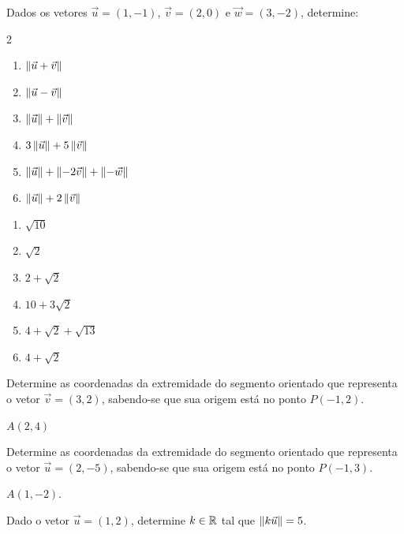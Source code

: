 \documentclass[12pt]{exam}
\begin{document}
\questao{} Dados os vetores $\vec{u} = (1, -1)$, $\vec{v} = (2, 0)$ e $\vec{w} = (3, -2)$, determine:
\begin{multicols}{2}
    \begin{enumerate}[label=({\alph*})]
        \item $\left\Vert{\vec{u} + \vec{v}}\right\Vert$
        \item $\left\Vert{\vec{u} - \vec{v}}\right\Vert$
        \item $\left\Vert{\vec{u}}\right\Vert + \left\Vert{\vec{v}}\right\Vert$
        \item $3\left\Vert{\vec{u}}\right\Vert + 5\left\Vert{\vec{v}}\right\Vert$
        \item $\left\Vert{\vec{u}}\right\Vert + \left\Vert{-2\vec{v}}\right\Vert + \left\Vert{-\vec{w}}\right\Vert$
        \item $\left\Vert{\vec{u}}\right\Vert + 2\left\Vert{\vec{v}}\right\Vert$
    \end{enumerate}
\end{multicols}
\begin{solucao}
    \begin{enumerate}[label=({\alph*})]
        \item $\sqrt{10}$
        \item $\sqrt{2}$
        \item $2 + \sqrt{2}$
        \item $10 + 3\sqrt{2}$
        \item $4 + \sqrt{2} + \sqrt{13}$
        \item $4 + \sqrt{2}$
    \end{enumerate}
\end{solucao}

\vspace{.3cm}

\questao{} Determine as coordenadas da extremidade do segmento orientado que representa o vetor $\vec{v} = (3,2)$, sabendo-se que sua origem está no ponto $P(-1,2)$.
\begin{solucao}
    $A(2,4)$
\end{solucao}

\vspace{.3cm}

\questao{} Determine as coordenadas da extremidade do segmento orientado que representa o vetor $\vec{u} = (2,-5)$, sabendo-se que sua origem está no ponto $P(-1,3)$.
\begin{solucao}
    $A(1, -2)$.
\end{solucao}

\vspace{.3cm}

\questao{} Dado o vetor $\vec{u} = (1, 2)$, determine $k \in \mathbb{R}$ tal que $\left\Vert{k\vec{u}}\right\Vert = 5$.
\end{document}
